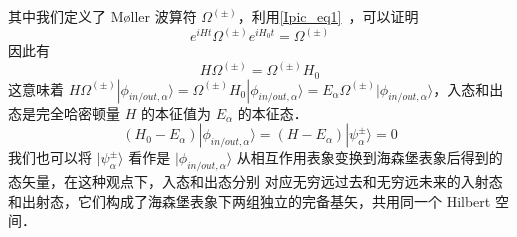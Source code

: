 其中我们定义了 Møller 波算符 $\Omega^{(\pm)}$，利用\autoref{Ipic_eq1}~，可以证明
\begin{equation}
e^{iHt}\Omega^{(\pm)} e^{iH_0 t}=\Omega^{(\pm)}
\end{equation}
因此有
\begin{equation}
H\Omega^{(\pm)}=\Omega^{(\pm)}H_0
\end{equation}
这意味着 $H\Omega^{(\pm)}|\phi_{in/out,\alpha}\rangle=\Omega^{(\pm)}H_0|\phi_{in/out,\alpha}\rangle =E_\alpha \Omega^{(\pm)}|\phi_{in/out,\alpha}\rangle$，入态和出态是完全哈密顿量 $H$ 的本征值为 $E_\alpha$ 的本征态．
\begin{equation}
(H_0-E_\alpha)|\phi_{in/out,\alpha}\rangle=(H-E_\alpha)|\psi_\alpha^{\pm}\rangle=0
\end{equation}
我们也可以将 $|\psi_\alpha^{\pm}\rangle$ 看作是 $|\phi_{in/out,\alpha}\rangle$ 从相互作用表象变换到海森堡表象后得到的态矢量，在这种观点下，入态和出态分别 对应无穷远过去和无穷远未来的入射态和出射态，它们构成了海森堡表象下两组独立的完备基矢，共用同一个 Hilbert 空间．
